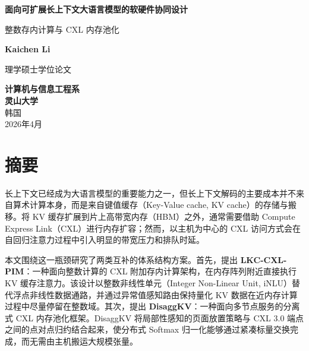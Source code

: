 \documentclass[11pt,a4paper,oneside,fontset=none]{ctexbook}
\begin{document}

\begin{titlepage}
    \begin{center}
        \vspace*{2cm}

        \Huge
        \textbf{面向可扩展长上下文大语言模型的软硬件协同设计}

        \vspace{0.5cm}
        \LARGE
        整数存内计算与 CXL 内存池化

        \vspace{2cm}

        \Large
        \textbf{Kaichen Li}

        \vfill

        \vspace{1.5cm}
        \vspace{0.8cm}

        理学硕士学位论文

        \vspace{1.5cm}

        \textbf{计算机与信息工程系}\\
        \textbf{灵山大学}\\
        韩国\\
        \vfill
        2026年4月

    \end{center}
\end{titlepage}

\cleardoublepage
\frontmatter

\chapter*{摘要}
长上下文已经成为大语言模型的重要能力之一，但长上下文解码的主要成本并不来自算术计算本身，而是来自键值缓存（Key-Value cache, KV cache）的存储与搬移。将 KV 缓存扩展到片上高带宽内存（HBM）之外，通常需要借助 Compute Express Link（CXL）进行内存扩容；然而，以主机为中心的 CXL 访问方式会在自回归注意力过程中引入明显的带宽压力和排队时延。

本文围绕这一瓶颈研究了两类互补的体系结构方案。首先，提出 \textbf{LKC-CXL-PIM}：一种面向整数计算的 CXL 附加存内计算架构，在内存阵列附近直接执行 KV 缓存注意力。该设计以整数非线性单元（Integer Non-Linear Unit, iNLU）替代浮点非线性数据通路，并通过异常值感知路由保持量化 KV 数据在近内存计算过程中尽量停留在整数域。其次，提出 \textbf{DisaggKV}：一种面向多节点服务的分离式 CXL 内存池化框架。DisaggKV 将局部性感知的页面放置策略与 CXL 3.0 端点之间的点对点归约结合起来，使分布式 Softmax 归一化能够通过紧凑标量交换完成，而无需由主机搬运大规模张量。
\end{document}
